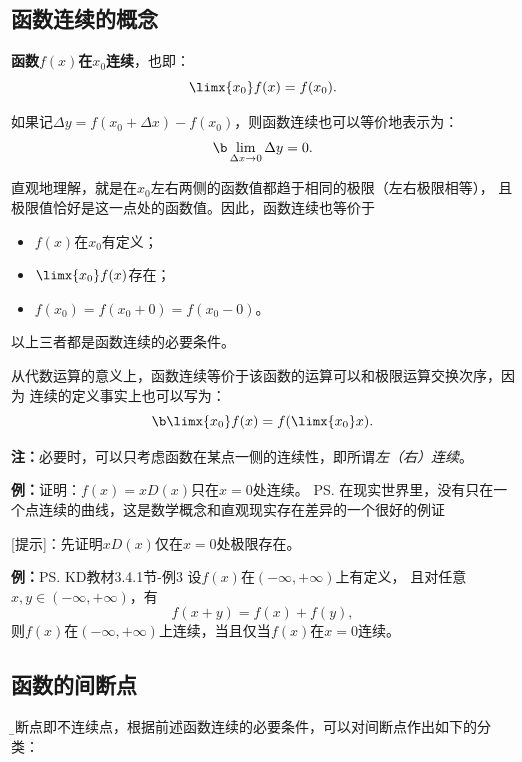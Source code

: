 \subsection{函数连续的概念}

\begin{thx}
{\bf 函数$f(x)$在$x_0$连续}，也即：
	$$\limx{x_0}f(x)=f(x_0).$$
\end{thx}
如果记$\Delta y=f(x_0+\Delta x)-f(x_0)$，则函数连续也可以等价地表示为：
$$\b\lim\limits_{\Delta x\to 0}\Delta y=0.$$

直观地理解，就是在$x_0$左右两侧的函数值都趋于相同的极限（左右极限相等），
且极限值恰好是这一点处的函数值。因此，函数连续也等价于
\begin{itemize}
  \setlength{\itemindent}{1cm}
  \item $f(x)$在$x_0$有定义； 
  \item $\limx{x_0}f(x)$存在； 
  \item $f(x_0)=f(x_0+0)=f(x_0-0)$。
\end{itemize}
以上三者都是函数连续的必要条件。

从代数运算的意义上，函数连续等价于该函数的运算可以和极限运算交换次序，因为
连续的定义事实上也可以写为：
$$\b\limx{x_0}f(x)=f(\limx{x_0}x).$$

{\bf 注：}必要时，可以只考虑函数在某点一侧的连续性，即所谓{\it 左（右）连续}。

{\bf 例：}证明：$f(x)=xD(x)$只在$x=0$处连续。
\ps{在现实世界里，没有只在一个点连续的曲线，这是数学概念和直观现实存在差异的一个很好的例证}

[提示]：先证明$xD(x)$仅在$x=0$处极限存在。

{\bf 例：}\ps{KD教材3.4.1节-例3}
设$f(x)$在$(-\infty,+\infty)$上有定义，
且对任意$x,y\in (-\infty,+\infty)$，有
$$f(x+y)=f(x)+f(y),$$
则$f(x)$在$(-\infty,+\infty)$上连续，当且仅当$f(x)$在$x=0$连续。


\subsection{函数的间断点}

{\b 间断点}即不连续点，根据前述函数连续的必要条件，可以对间断点作出如下的分类：

